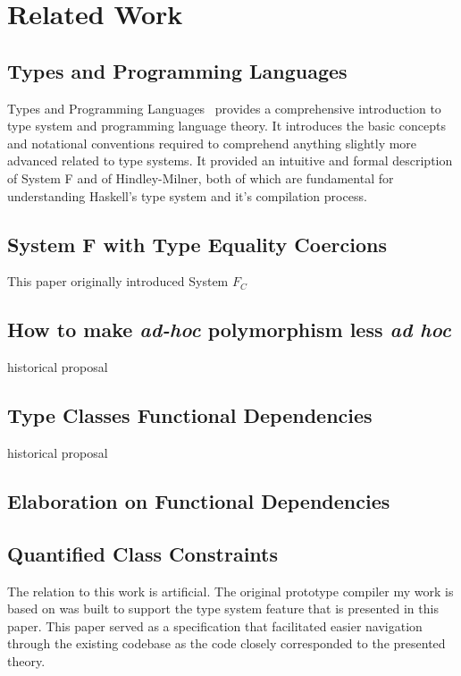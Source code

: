 \section{Related Work}


\subsection{Types and Programming Languages}

Types and Programming Languages~\cite{pierce2002types} provides a comprehensive introduction to type system and programming
language theory. It introduces the basic concepts and notational conventions
required to comprehend anything slightly more advanced related to type systems.
It provided an intuitive and formal description of System F and of
Hindley-Milner, both of which are fundamental for understanding Haskell's type
system and it's compilation process.
\subsection{System F with Type Equality
Coercions\cite{Sulzmann:2007:SFT:1190315.1190324}}
This paper originally introduced System $F_C$
\subsection{How to make \textit{ad-hoc} polymorphism less \textit{ad
hoc}\cite{Wadler:1989:MAP:75277.75283}}
historical proposal
\subsection{Type Classes Functional Dependencies\cite{Jones00typeclasses}}
historical proposal
\subsection{Elaboration on Functional
Dependencies\cite{Karachalias:2017:EFD:3156695.3122966}}

\subsection{Quantified Class Constraints\cite{Bottu:2017:QCC:3156695.3122967}}
The relation to this work is artificial. The original prototype compiler my work
is based on was built to support the type system feature that is presented in
this paper. This paper served as a specification that facilitated easier
navigation through the existing codebase as the code closely corresponded to the
presented theory.
